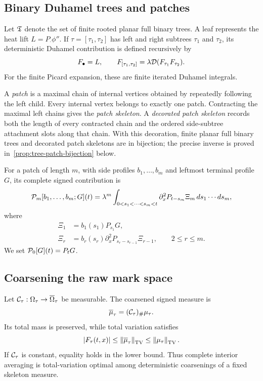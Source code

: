 \subsection{Binary Duhamel trees and patches}

Let $\mathfrak T$ denote the set of finite rooted planar full binary trees. A leaf represents the heat lift $L=P_\cdot\phi''$. If $\tau=[\tau_1,\tau_2]$ has left and right subtrees $\tau_1$ and $\tau_2$, its deterministic Duhamel contribution is defined recursively by
\begin{equation}
  F_\bullet=L,
  \qquad
  F_{[\tau_1,\tau_2]}
  =
  \lambda\mathcal D(F_{\tau_1}F_{\tau_2}).
  \label{eq:tree-profile-recursion}
\end{equation}
For the finite Picard expansion, these are finite iterated Duhamel integrals.

A \emph{patch} is a maximal chain of internal vertices obtained by repeatedly following the left child. Every internal vertex belongs to exactly one patch. Contracting the maximal left chains gives the \emph{patch skeleton}. A \emph{decorated patch skeleton} records both the length of every contracted chain and the ordered side-subtree attachment slots along that chain. With this decoration, finite planar full binary trees and decorated patch skeletons are in bijection; the precise inverse is proved in~\cref{prop:tree-patch-bijection} below.

For a patch of length $m$, with side profiles $b_1,\ldots,b_m$ and leftmost terminal profile $G$, its complete signed contribution is
\begin{equation}
  \mathcal P_m[b_1,\ldots,b_m;G](t)
  =
  \lambda^m
  \int_{0<s_1<\cdots<s_m<t}
  \partial_x^2P_{t-s_m}\Xi_m
  \,ds_1\cdots ds_m,
  \label{eq:complete-patch}
\end{equation}
where
\begin{align*}
  \Xi_1&=b_1(s_1)P_{s_1}G,\\
  \Xi_r&=b_r(s_r)\partial_x^2P_{s_r-s_{r-1}}\Xi_{r-1},
  \qquad 2\leq r\leq m.
\end{align*}
We set $\mathcal P_0[G](t)=P_tG$.



\subsection{Coarsening the raw mark space}

Let $\mathcal C_\tau:\Omega_\tau\to\overline\Omega_\tau$ be measurable. The coarsened signed measure is
\begin{equation}
  \overline\mu_\tau
  =
  (\mathcal C_\tau)_{\#}\mu_\tau.
  \label{eq:pushforward-def}
\end{equation}
Its total mass is preserved, while total variation satisfies
\begin{equation}
  \left|F_\tau(t,x)\right|
  \leq
  \left\lVert\overline\mu_\tau\right\rVert_{\mathrm{TV}}
  \leq
  \left\lVert\mu_\tau\right\rVert_{\mathrm{TV}}.
  \label{eq:tv-coarsening-sandwich}
\end{equation}
If $\mathcal C_\tau$ is constant, equality holds in the lower bound. Thus complete interior averaging is total-variation optimal among deterministic coarsenings of a fixed skeleton measure.

